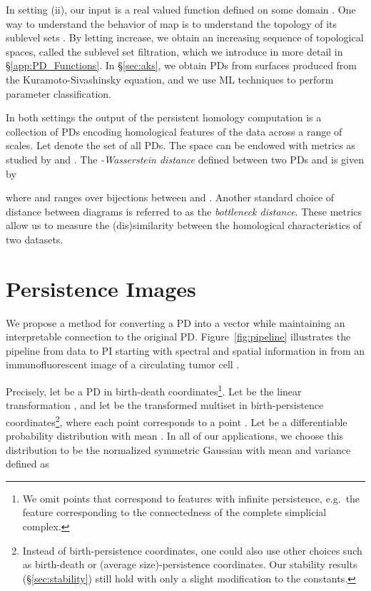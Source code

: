 \documentclass[11pt]{article}
\begin{document}
In setting (ii), our input is a real valued function  defined on some domain . One way to understand the behavior of map  is to understand the topology of its sublevel sets . By letting  increase, we obtain an increasing sequence of topological spaces, called the sublevel set filtration, which we introduce in more detail in \S\ref{app:PD_Functions}. In \S\ref{sec:aks}, we obtain PDs from surfaces  produced from the Kuramoto-Sivashinsky equation, and we use ML techniques to perform parameter classification.

In both settings the output of the persistent homology computation is a collection of PDs encoding homological features of the data across a range of scales.  Let  denote the set of all PDs. The space  can be endowed with metrics as studied by \citet{stabilityPD} and \citet{probabilityonPD}. The \emph{-Wasserstein distance} defined between two PDs  and  is given by

where  and  ranges over bijections between  and . Another standard choice of distance between diagrams is 
referred to as the \emph{bottleneck distance}.  These metrics allow us to measure the (dis)similarity between the homological characteristics of two datasets.

\section{Persistence Images}\label{sec:persistenceimages}

We propose a method for converting a PD into a vector while maintaining an interpretable connection to the original PD. Figure~\ref{fig:pipeline} illustrates the pipeline from data to PI starting with spectral and spatial information in  from an immunofluorescent image of a circulating tumor cell \citep{emersonCTC}.

Precisely, let  be a PD in birth-death coordinates\footnote{We omit points that correspond to features with infinite persistence, e.g.\ the  feature corresponding to the connectedness of the complete simplicial complex.}. Let  be the linear transformation , and let  be the transformed multiset in birth-persistence coordinates\footnote{Instead of birth-persistence coordinates, one could also use other choices such as birth-death or (average size)-persistence coordinates. Our stability results (\S\ref{sec:stability}) still hold with only a slight modification to the constants.}, where each point  corresponds to a point . Let  be a differentiable probability distribution with mean .  In all of our applications, we choose this distribution to be the normalized symmetric Gaussian  with mean  and variance  defined as
\end{document}

